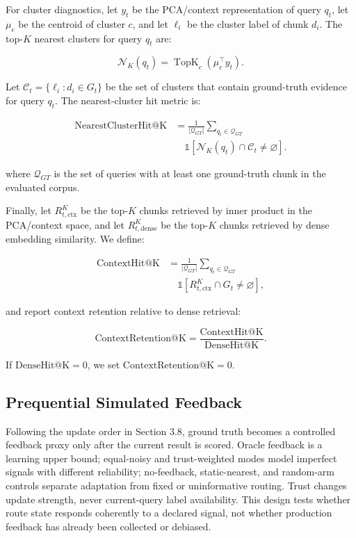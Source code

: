 For cluster diagnostics, let $y_t$ be the PCA/context representation of query $q_t$, let $\mu_c$ be the centroid of cluster $c$, and let $\ell_i$ be the cluster label of chunk $d_i$. The top-$K$ nearest clusters for query $q_t$ are:

\[
\mathcal{N}_K(q_t) =
\operatorname{TopK}_{c}
\left(\mu_c^\top y_t\right).
\]

Let $\mathcal{C}_t = \{\ell_i : d_i \in G_t\}$ be the set of clusters that contain ground-truth evidence for query $q_t$. The nearest-cluster hit metric is:

\[
\begin{aligned}
\mathrm{NearestClusterHit@K} &=
\frac{1}{|\mathcal{Q}_{GT}|}
\sum_{q_t \in \mathcal{Q}_{GT}} \\
&\quad
\mathbb{1}
\left[
\mathcal{N}_K(q_t) \cap \mathcal{C}_t \neq \varnothing
\right].
\end{aligned}
\]

where $\mathcal{Q}_{GT}$ is the set of queries with at least one ground-truth chunk in the evaluated corpus.

Finally, let $R_{t,\mathrm{ctx}}^K$ be the top-$K$ chunks retrieved by inner product in the PCA/context space, and let $R_{t,\mathrm{dense}}^K$ be the top-$K$ chunks retrieved by dense embedding similarity. We define:

\[
\begin{aligned}
\mathrm{ContextHit@K} &=
\frac{1}{|\mathcal{Q}_{GT}|}
\sum_{q_t \in \mathcal{Q}_{GT}} \\
&\quad
\mathbb{1}
\left[
R_{t,\mathrm{ctx}}^K \cap G_t \neq \varnothing
\right],
\end{aligned}
\]

and report context retention relative to dense retrieval:

\[
\mathrm{ContextRetention@K} =
\frac{\mathrm{ContextHit@K}}
     {\mathrm{DenseHit@K}}.
\]

If $\mathrm{DenseHit@K}=0$, we set $\mathrm{ContextRetention@K}=0$.

\subsection{Prequential Simulated Feedback}
\label{sec:05-experimental-setup:prequential-simulated-feedback}

Following the update order in Section 3.8, ground truth becomes a controlled feedback proxy only after the current result is scored. Oracle feedback is a learning upper bound; equal-noisy and trust-weighted modes model imperfect signals with different reliability; no-feedback, static-nearest, and random-arm controls separate adaptation from fixed or uninformative routing. Trust changes update strength, never current-query label availability. This design tests whether route state responds coherently to a declared signal, not whether production feedback has already been collected or debiased.


